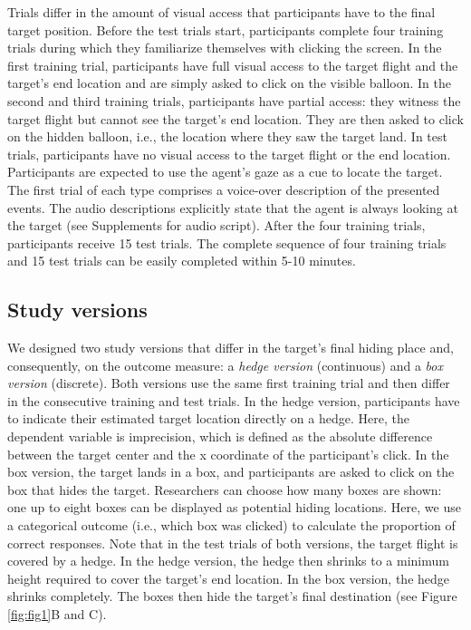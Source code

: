 \documentclass[
  man,floatsintext]{apa6}
\begin{document}
Trials differ in the amount of visual access that participants have to the final target position.
Before the test trials start, participants complete four training trials during which they familiarize themselves with clicking the screen.
In the first training trial, participants have full visual access to the target flight and the target's end location and are simply asked to click on the visible balloon.
In the second and third training trials, participants have partial access: they witness the target flight but cannot see the target's end location.
They are then asked to click on the hidden balloon, i.e., the location where they saw the target land.
In test trials, participants have no visual access to the target flight or the end location.
Participants are expected to use the agent's gaze as a cue to locate the target.
The first trial of each type comprises a voice-over description of the presented events.
The audio descriptions explicitly state that the agent is always looking at the target (see Supplements for audio script).
After the four training trials, participants receive 15 test trials.
The complete sequence of four training trials and 15 test trials can be easily completed within 5-10 minutes.

\hypertarget{study-versions}{%
\subsection{Study versions}\label{study-versions}}

We designed two study versions that differ in the target's final hiding place and, consequently, on the outcome measure: a \emph{hedge version} (continuous) and a \emph{box version} (discrete).
Both versions use the same first training trial and then differ in the consecutive training and test trials.
In the hedge version, participants have to indicate their estimated target location directly on a hedge.
Here, the dependent variable is imprecision, which is defined as the absolute difference between the target center and the x coordinate of the participant's click.
In the box version, the target lands in a box, and participants are asked to click on the box that hides the target.
Researchers can choose how many boxes are shown: one up to eight boxes can be displayed as potential hiding locations.
Here, we use a categorical outcome (i.e., which box was clicked) to calculate the proportion of correct responses.
Note that in the test trials of both versions, the target flight is covered by a hedge.
In the hedge version, the hedge then shrinks to a minimum height required to cover the target's end location.
In the box version, the hedge shrinks completely.
The boxes then hide the target's final destination (see Figure \ref{fig:fig1}B and C).
\end{document}
